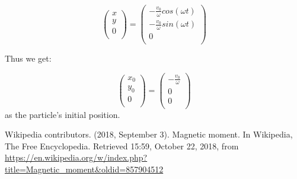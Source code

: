 \documentclass[a4paper,12pt,twoside]{article}
\begin{document}
\begin{equation*}
	\begin{pmatrix} x\\ y\\ 0\\ \end{pmatrix} = \begin{pmatrix} -\frac{v_0}{\omega} cos(\omega t)\\ -\frac{v_0}{\omega} sin(\omega t)\\ 0\\ \end{pmatrix}
\end{equation*}

	Thus we get:

\begin{equation*}
	\begin{pmatrix} x_0\\ y_0\\ 0\\ \end{pmatrix} = \begin{pmatrix} -\frac{v_0}{\omega}\\ 0\\ 0\\ \end{pmatrix}
\end{equation*}
as the particle's initial position.


\begin{thebibliography}{99}
	Wikipedia contributors. (2018, September 3). Magnetic moment. In Wikipedia, The Free Encyclopedia. Retrieved 15:59, October 22, 2018, from \url{https://en.wikipedia.org/w/index.php?title=Magnetic_moment&oldid=857904512}
\end{thebibliography}
\end{document}
